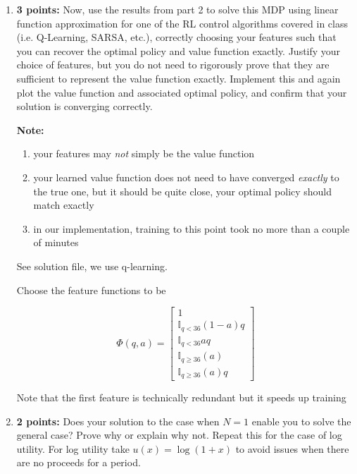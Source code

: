 \documentclass[12pt]{exam}
\begin{document}
\begin{questions}
\begin{enumerate}
\begin{solution}
\end{solution}


\item {\bf 3 points: } 
Now, use the results from part 2 to solve this MDP using linear function approximation for one of the RL control algorithms covered in class (i.e. Q-Learning, SARSA, etc.), correctly choosing your features such that you can recover the optimal policy and value function exactly. Justify your choice of features, but you do not need to rigorously prove that they are sufficient to represent the value function exactly. Implement this and again plot the value function and associated optimal policy, and confirm that your solution is converging correctly.

{\bf Note:} 
\begin{enumerate}
    \item your features may {\em not} simply be the value function
    \item your learned value function does not need to have converged {\em exactly} to the true one, but it should be quite close, your optimal policy should match exactly
    \item in our implementation, training to this point took no more than a couple of minutes
\end{enumerate}

\begin{solution}

See solution file, we use q-learning.

Choose the feature functions to be 

\[\Phi(q, a) = \begin{bmatrix} 1\\
\mathbb{I}_{q < 36}(1 - a)q\\
\mathbb{I}_{q < 36} a q\\
\mathbb{I}_{q \geq 36}(a) \\
\mathbb{I}_{q \geq 36}(a) q
\end{bmatrix}\]

Note that the first feature is technically redundant but it speeds up training

\end{solution}


\item {\bf 2 points: } Does your solution to the case when $N=1$ enable you to solve the general case? Prove why or explain why not. Repeat this for the case of log utility. For log utility take $u(x) = \log(1+x)$ to avoid issues when there are no proceeds for a period. 


\end{enumerate}
\end{questions}
\end{document}
